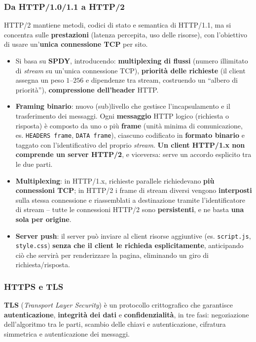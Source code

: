 \documentclass[12pt, a4paper]{article}
\begin{document}
\subsubsection{Da HTTP/1.0/1.1 a HTTP/2}

HTTP/2 mantiene metodi, codici di stato e semantica di HTTP/1.1, ma si concentra sulle \textbf{prestazioni} (latenza percepita, uso delle risorse), con l'obiettivo di usare un'\textbf{unica connessione TCP} per sito.

\begin{itemize}
    \item Si basa su \textbf{SPDY}, introducendo: \textbf{multiplexing di flussi} (numero illimitato di \textit{stream} su un'unica connessione TCP), \textbf{priorità delle richieste} (il client assegna un peso $1$--$256$ e dipendenze tra stream, costruendo un ``albero di priorità''), \textbf{compressione dell'header} HTTP.
    \item \textbf{Framing binario}: nuovo (sub)livello che gestisce l'incapsulamento e il trasferimento dei messaggi. Ogni \textbf{messaggio} HTTP logico (richiesta o risposta) è composto da uno o più \textbf{frame} (unità minima di comunicazione, es. \texttt{HEADERS frame}, \texttt{DATA frame}), ciascuno codificato in \textbf{formato binario} e taggato con l'identificativo del proprio \textit{stream}. \textbf{Un client HTTP/1.x non comprende un server HTTP/2}, e viceversa: serve un accordo esplicito tra le due parti.
    \item \textbf{Multiplexing}: in HTTP/1.x, richieste parallele richiedevano \textbf{più connessioni TCP}; in HTTP/2 i frame di stream diversi vengono \textbf{interposti} sulla stessa connessione e riassemblati a destinazione tramite l'identificatore di stream -- tutte le connessioni HTTP/2 sono \textbf{persistenti}, e ne basta \textbf{una sola per origine}.
    \item \textbf{Server push}: il server può inviare al client risorse aggiuntive (es. \texttt{script.js}, \texttt{style.css}) \textbf{senza che il client le richieda esplicitamente}, anticipando ciò che servirà per renderizzare la pagina, eliminando un giro di richiesta/risposta.
\end{itemize}

\subsubsection{HTTPS e TLS}

\textbf{TLS} (\textit{Transport Layer Security}) è un protocollo crittografico che garantisce \textbf{autenticazione}, \textbf{integrità dei dati} e \textbf{confidenzialità}, in tre fasi: negoziazione dell'algoritmo tra le parti, scambio delle chiavi e autenticazione, cifratura simmetrica e autenticazione dei messaggi.
\end{document}
